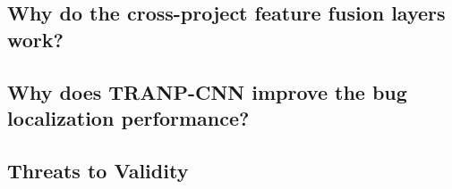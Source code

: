 \subsection{Why do the cross-project feature fusion layers work? }

\subsection{Why does TRANP-CNN improve the bug localization performance?}

\subsection{Threats to Validity}
